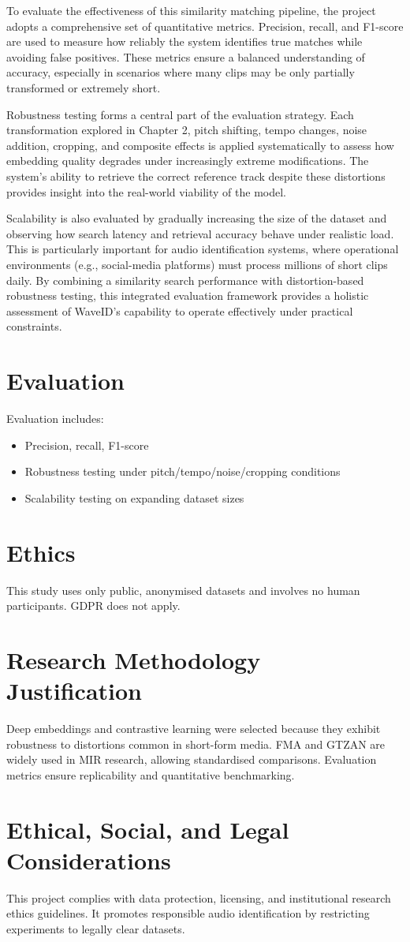 \documentclass[../Thesis]{subfiles}
\begin{document}
To evaluate the effectiveness of this similarity matching pipeline, the project adopts a comprehensive set of quantitative metrics. Precision, recall, and F1-score are used to measure how reliably the system identifies true matches while avoiding false positives. These metrics ensure a balanced understanding of accuracy, especially in scenarios where many clips may be only partially transformed or extremely short. 

Robustness testing forms a central part of the evaluation strategy. Each transformation explored in Chapter 2, pitch shifting, tempo changes, noise addition, cropping, and composite effects is applied systematically to assess how embedding quality degrades under increasingly extreme modifications. The system's ability to retrieve the correct reference track despite these distortions provides insight into the real-world viability of the model.

Scalability is also evaluated by gradually increasing the size of the dataset and observing how search latency and retrieval accuracy behave under realistic load. This is particularly important for audio identification systems, where operational environments (e.g., social-media platforms) must process millions of short clips daily. By combining a similarity search performance with distortion-based robustness testing, this integrated evaluation framework provides a holistic assessment of WaveID’s capability to operate effectively under practical constraints.

\section{Evaluation}
Evaluation includes:
\begin{itemize}
\item Precision, recall, F1-score
\item Robustness testing under pitch/tempo/noise/cropping conditions
\item Scalability testing on expanding dataset sizes
\end{itemize}

\section{Ethics}
This study uses only public, anonymised datasets and involves no human participants. GDPR does not apply.

\section{Research Methodology Justification}
Deep embeddings and contrastive learning were selected because they exhibit robustness to distortions common in short-form media. FMA and GTZAN are widely used in MIR research, allowing standardised comparisons. Evaluation metrics ensure replicability and quantitative benchmarking.

\section{Ethical, Social, and Legal Considerations}
This project complies with data protection, licensing, and institutional research ethics guidelines. It promotes responsible audio identification by restricting experiments to legally clear datasets.
\end{document}
